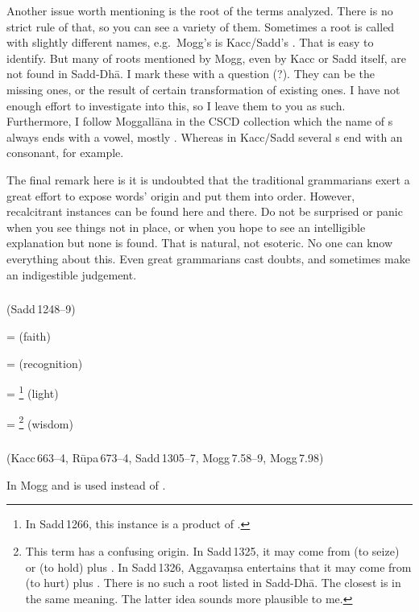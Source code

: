 Another issue worth mentioning is the root of the terms analyzed. There is no strict rule of that, so you can see a variety of them. Sometimes a root is called with slightly different names, e.g.\ Mogg's  is Kacc/Sadd's . That is easy to identify. But many of roots mentioned by Mogg, even by Kacc or Sadd itself, are not found in Sadd-Dh\=a. I mark these with a question (?). They can be the missing ones, or the result of certain transformation of existing ones. I have not enough effort to investigate into this, so I leave them to you as such. Furthermore, I follow Moggall\=ana in the CSCD collection which the name of s always ends with a vowel, mostly . Whereas in Kacc/Sadd several s end with an  consonant,  for example.

The final remark here is it is undoubted that the traditional grammarians exert a great effort to expose words' origin and put them into order. However, recalcitrant instances can be found here and there. Do not be surprised or panic when you see things not in place, or when you hope to see an intelligible explanation but none is found. That is natural, not esoteric. No one can know everything about this. Even great grammarians cast doubts, and sometimes make an indigestible judgement.

\subparagraph*{} (Sadd\,1248--9)\label{pacckx:a}

 =  (faith)\par
{} =  (recognition)\par
{} = \footnote{In Sadd\,1266, this instance is a product of .} (light)\par
{} = \footnote{This term has a confusing origin. In Sadd\,1325, it may come from  (to seize) or  (to hold) plus . In Sadd\,1326, Aggava\d msa entertains that it may come from  (to hurt) plus . There is no such a root listed in Sadd-Dh\=a. The closest is  in the same meaning. The latter idea sounds more plausible to me.} (wisdom)\par

\subparagraph*{} (Kacc\,663--4, R\=upa\,673--4, Sadd\,1305--7, Mogg\,7.58--9, Mogg\,7.98)\label{pacckx:ka1}\label{pacckx:dda}\label{pacckx:dha1}

In Mogg  and  is used instead of .

